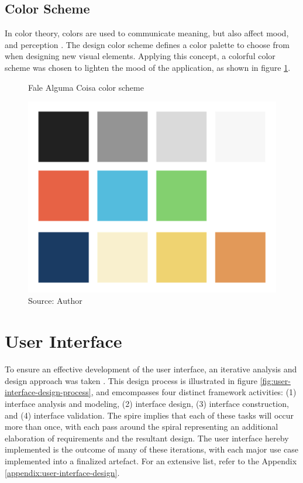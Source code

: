 \subsection{Color Scheme}

In color theory, colors are used to communicate meaning, but also affect mood, and perception \cite{agoston2013color}. The design color scheme defines a color palette to choose from when designing new visual elements. Applying this concept, a colorful color scheme was chosen to lighten the mood of the application, as shown in figure \ref{fig:falealgumacoisa-color-scheme}.

\begin{figure}[h]
    \centering
    \caption{Fale Alguma Coisa color scheme}
     \includegraphics[width=.5\linewidth]{images/app/colors.png}
    \caption*{Source: Author}
    \label{fig:falealgumacoisa-color-scheme}
\end{figure}

\section{User Interface}
\label{sec:app-user-interface}

To ensure an effective development of the user interface, an iterative analysis and design approach was taken \cite{pressman2014software}. This design process is illustrated in figure \ref{fig:user-interface-design-process}, and emcompasses four distinct framework activities: (1) interface analysis and modeling, (2) interface design, (3) interface construction, and (4) interface validation. The spire implies that each of these tasks will occur more than once, with each pass around the spiral representing an additional elaboration of requirements and the resultant design. The user interface hereby implemented is the outcome of many of these iterations, with each major use case implemented into a finalized artefact. For an extensive list, refer to the Appendix \ref{appendix:user-interface-design}.

